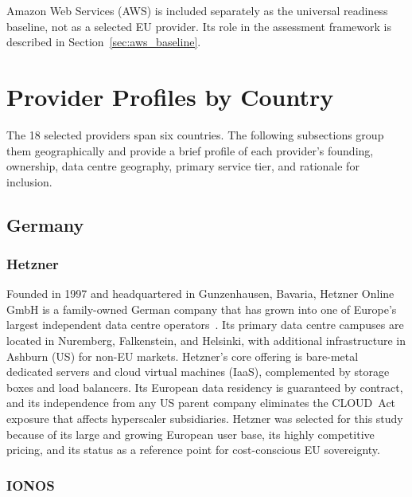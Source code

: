 Amazon Web Services (AWS) is included separately as the universal readiness baseline, not as a selected EU provider. Its role in the assessment framework is described in Section~\ref{sec:aws_baseline}.

\section{Provider Profiles by Country}
\label{sec:provider_profiles}

The 18 selected providers span six countries. The following subsections group them geographically and provide a brief profile of each provider's founding, ownership, data centre geography, primary service tier, and rationale for inclusion.

\subsection{Germany}

\subsubsection{Hetzner}

Founded in 1997 and headquartered in Gunzenhausen, Bavaria, Hetzner Online GmbH is a family-owned German company that has grown into one of Europe's largest independent data centre operators~\cite{Hetzner_About}. Its primary data centre campuses are located in Nuremberg, Falkenstein, and Helsinki, with additional infrastructure in Ashburn (US) for non-EU markets. Hetzner's core offering is bare-metal dedicated servers and cloud virtual machines (IaaS), complemented by storage boxes and load balancers. Its European data residency is guaranteed by contract, and its independence from any US parent company eliminates the CLOUD~Act exposure that affects hyperscaler subsidiaries. Hetzner was selected for this study because of its large and growing European user base, its highly competitive pricing, and its status as a reference point for cost-conscious EU sovereignty.

\subsubsection{IONOS}

